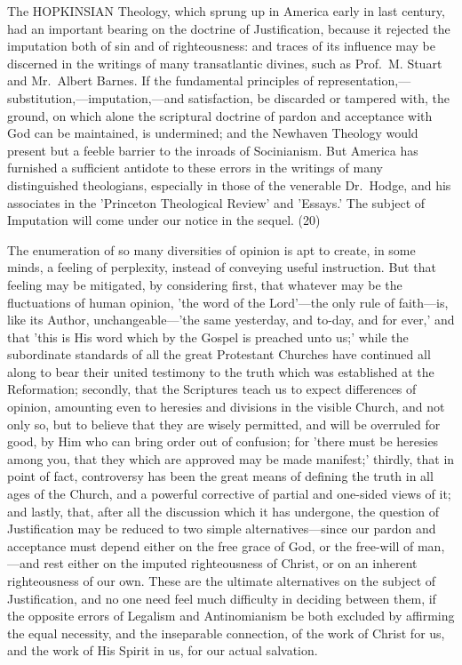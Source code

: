 \documentclass[
]{book}
\begin{document}
The HOPKINSIAN Theology, which sprung up in America early in last century, had an important bearing on the doctrine of Justification, because it rejected the imputation both of sin and of righteousness: and traces of its influence may be discerned in the writings of many transatlantic divines, such as Prof.~M. Stuart and Mr.~Albert Barnes. If the fundamental principles of representation,---substitution,---imputation,---and satisfaction, be discarded or tampered with, the ground, on which alone the scriptural doctrine of pardon and acceptance with God can be maintained, is undermined; and the Newhaven Theology would present but a feeble barrier to the inroads of Socinianism. But America has furnished a sufficient antidote to these errors in the writings of many distinguished theologians, especially in those of the venerable Dr.~Hodge, and his associates in the 'Princeton Theological Review' and 'Essays.' The subject of Imputation will come under our notice in the sequel. (20)

The enumeration of so many diversities of opinion is apt to create, in some minds, a feeling of perplexity, instead of conveying useful instruction. But that feeling may be mitigated, by considering first, that whatever may be the fluctuations of human opinion, 'the word of the Lord'---the only rule of faith---is, like its Author, unchangeable---'the same yesterday, and to-day, and for ever,' and that 'this is His word which by the Gospel is preached unto us;' while the subordinate standards of all the great Protestant Churches have continued all along to bear their united testimony to the truth which was established at the Reformation; secondly, that the Scriptures teach us to expect differences of opinion, amounting even to heresies and divisions in the visible Church, and not only so, but to believe that they are wisely permitted, and will be overruled for good, by Him who can bring order out of confusion; for 'there must be heresies among you, that they which are approved may be made manifest;' thirdly, that in point of fact, controversy has been the great means of defining the truth in all ages of the Church, and a powerful corrective of partial and one-sided views of it; and lastly, that, after all the discussion which it has undergone, the question of Justification may be reduced to two simple alternatives---since our pardon and acceptance must depend either on the free grace of God, or the free-will of man,---and rest either on the imputed righteousness of Christ, or on an inherent righteousness of our own. These are the ultimate alternatives on the subject of Justification, and no one need feel much difficulty in deciding between them, if the opposite errors of Legalism and Antinomianism be both excluded by affirming the equal necessity, and the inseparable connection, of the work of Christ for us, and the work of His Spirit in us, for our actual salvation.
\end{document}
